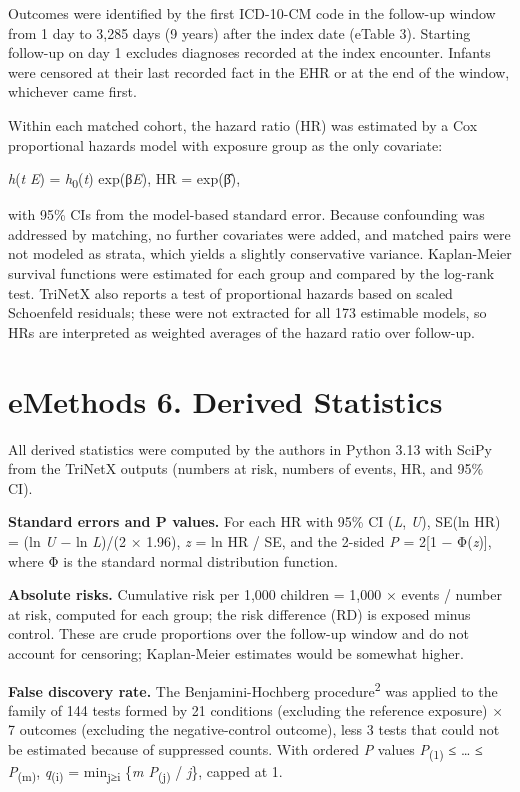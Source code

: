 \documentclass[11pt]{article}
\begin{document}
Outcomes were identified by the first ICD-10-CM code in the
follow-up window from 1 day to 3,285 days (9 years) after
the index date (eTable 3). Starting follow-up on day 1
excludes diagnoses recorded at the index encounter. Infants
were censored at their last recorded fact in the EHR or at
the end of the window, whichever came first.

Within each matched cohort, the hazard ratio (HR) was
estimated by a Cox proportional hazards model with exposure
group as the only covariate:

\emph{h}(\emph{t} \textbar{} \emph{E}) =
\emph{h}\textsubscript{0}(\emph{t}) exp(β\emph{E}), HR =
exp(β̂),

with 95\% CIs from the model-based standard error. Because
confounding was addressed by matching, no further covariates
were added, and matched pairs were not modeled as strata,
which yields a slightly conservative variance. Kaplan-Meier
survival functions were estimated for each group and
compared by the log-rank test. TriNetX also reports a test
of proportional hazards based on scaled Schoenfeld
residuals; these were not extracted for all 173 estimable
models, so HRs are interpreted as weighted averages of the
hazard ratio over follow-up.

\hypertarget{emethods-6.-derived-statistics}{%
\section*{eMethods 6. Derived
Statistics}\label{emethods-6.-derived-statistics}}

All derived statistics were computed by the authors in
Python 3.13 with SciPy from the TriNetX outputs (numbers at
risk, numbers of events, HR, and 95\% CI).

\textbf{Standard errors and P values.} For each HR with 95\%
CI (\emph{L}, \emph{U}), SE(ln HR) = (ln \emph{U} − ln
\emph{L})/(2 × 1.96), \emph{z} = ln HR / SE, and the 2-sided
\emph{P} = 2{[}1 − Φ(\textbar{}\emph{z}\textbar){]}, where Φ
is the standard normal distribution function.

\textbf{Absolute risks.} Cumulative risk per 1,000 children
= 1,000 × events / number at risk, computed for each group;
the risk difference (RD) is exposed minus control. These are
crude proportions over the follow-up window and do not
account for censoring; Kaplan-Meier estimates would be
somewhat higher.

\textbf{False discovery rate.} The Benjamini-Hochberg
procedure\textsuperscript{2} was applied to the family of
144 tests formed by 21 conditions (excluding the reference
exposure) × 7 outcomes (excluding the negative-control
outcome), less 3 tests that could not be estimated because
of suppressed counts. With ordered \emph{P} values
\emph{P}\textsubscript{(1)} ≤ \ldots{} ≤
\emph{P}\textsubscript{(m)}, \emph{q}\textsubscript{(i)} =
min\textsubscript{j≥i} \{\emph{m P}\textsubscript{(j)} /
\emph{j}\}, capped at 1.
\end{document}
